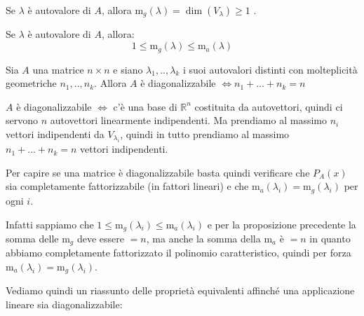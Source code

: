 \documentclass[
  a4paper,
]{article}
\begin{document}
\begin{observationbox}
Se \(\lambda\) è autovalore di \(A\), allora
\(\text{m}_g(\lambda) = \dim(V_\lambda) \ge 1\) .
\end{observationbox}

\begin{propositionbox}
Se \(\lambda\) è autovalore di \(A\), allora: \[
1 \le\text{m}_g(\lambda) \le \text{m}_a(\lambda)
\]
\end{propositionbox}

\begin{propositionbox}
Sia \(A\) una matrice \(n\times n\) e siano \(\lambda_1, .., \lambda_k\)
i suoi autovalori distinti con molteplicità geometriche
\(n_1, .., n_k\). Allora \(A\) è diagonalizzabile
\(\iff n_1 + ... + n_k = n\)
\end{propositionbox}

\begin{proofbox}
\(A\) è diagonalizzabile \(\iff\) c'è una base di \(\mathbb{R}^n\)
costituita da autovettori, quindi ci servono \(n\) autovettori
linearmente indipendenti. Ma prendiamo al massimo \(n_i\) vettori
indipendenti da \(V_{\lambda_i}\), quindi in tutto prendiamo al massimo
\(n_1 + ... + n_k = n\) vettori indipendenti.
\end{proofbox}

\begin{observationbox}
Per capire se una matrice è diagonalizzabile basta quindi verificare che
\(P_A(x)\) sia completamente fattorizzabile (in fattori lineari) e che
\(\text{m}_a(\lambda_i) = \text{m}_g(\lambda_i)\) per ogni \(i\).

Infatti sappiamo che
\(1 \leq \text{m}_g(\lambda_i) \leq \text{m}_a(\lambda_i)\) e per la
proposizione precedente la somma delle \(\text{m}_g\) deve essere
\(=n\), ma anche la somma della \(\text{m}_a\) è \(= n\) in quanto
abbiamo completamente fattorizzato il polinomio caratteristico, quindi
per forza \(\text{m}_a(\lambda_i) = \text{m}_g(\lambda_i)\).
\end{observationbox}

Vediamo quindi un riassunto delle proprietà equivalenti affinché una
applicazione lineare sia diagonalizzabile:
\end{document}

